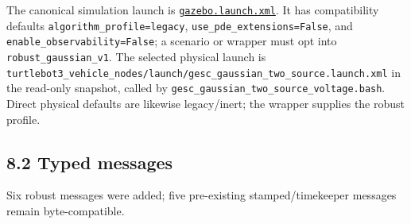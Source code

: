 \documentclass[
  10pt,
  letterpaper,
]{article}
\begin{document}
The canonical simulation launch is
\href{../../../ros2_ws/src/turtlebot3_rotating_sensor/launch/gazebo.launch.xml}{\nolinkurl{gazebo.launch.xml}}.
It has compatibility defaults \nolinkurl{algorithm\_profile=legacy},
\nolinkurl{use\_pde\_extensions=False}, and \nolinkurl{enable\_observability=False}; a scenario or
wrapper must opt into \nolinkurl{robust\_gaussian\_v1}. The selected physical launch is
\nolinkurl{turtlebot3\_vehicle\_nodes/launch/gesc\_gaussian\_two\_source.launch.xml} in the
read-only snapshot, called by
\nolinkurl{gesc\_gaussian\_two\_source\_voltage.bash}. Direct physical defaults are likewise
legacy/inert; the wrapper supplies the robust profile.

\subsection{8.2 Typed messages}\label{typed-messages}

Six robust messages were added; five pre-existing stamped/timekeeper messages
remain byte-compatible.
\end{document}

